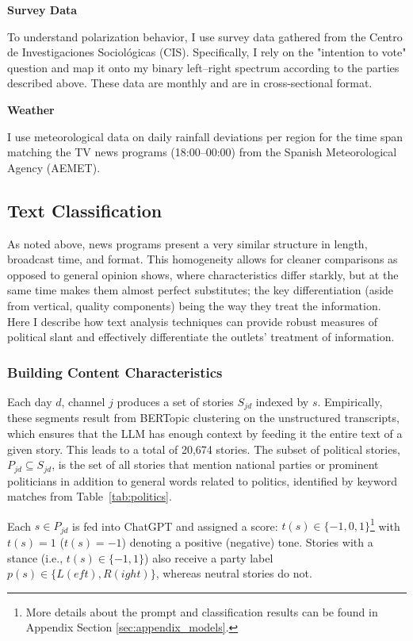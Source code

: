 \documentclass[12pt]{article}
\begin{document}
	
	\textbf{Survey Data}
	
	To understand polarization behavior, I use survey data gathered from the Centro de Investigaciones Sociológicas (CIS). Specifically, I rely on the "intention to vote" question and map it onto my binary left–right spectrum according to the parties described above. These data are monthly and are in cross-sectional format.
	
	\textbf{Weather}
	
	I use meteorological data on daily rainfall deviations per region for the time span matching the TV news programs (18:00–00:00) from the Spanish Meteorological Agency (AEMET).
	

	
	
	
	\subsection{Text Classification}
	
	As noted above,  news programs present a very similar structure in length, broadcast time, and format. This homogeneity allows for cleaner comparisons as opposed to general opinion shows, where characteristics differ starkly, but at the same time makes them almost perfect substitutes; the key differentiation (aside from vertical, quality components) being the way they treat the information. Here I describe how text analysis techniques can provide robust measures of political slant and effectively differentiate the outlets' treatment of  information. 
	

	
	\subsubsection*{Building Content Characteristics}
	
	Each day \(d\), channel \(j\) produces a set of stories \(S_{jd}\) indexed by \(s\). Empirically, these segments result from BERTopic clustering on the unstructured transcripts, which ensures that the LLM has enough context by feeding it the entire text of a given story. This leads to a total of 20,674 stories. The subset of political stories, \({P}_{jd}\subseteq S_{jd}\), is the set of all stories that mention national parties or prominent politicians in addition to general words related to politics, identified by keyword matches from Table~\ref{tab:politics}.
	
	Each \(s\in {P}_{jd}\) is fed into ChatGPT and  assigned a score: \({t}(s)\in\{-1,0,1\}\)\footnote{More details about the prompt and classification results can be found in Appendix Section \ref{sec:appendix_models}.} with ${t}(s)=1$ (${t}(s)=-1$) denoting a positive (negative) tone. Stories with a stance (i.e., \({t}(s)\in\{-1,1\}\)) also receive a party label \({p}(s)\in\{L(eft),R(ight)\}\), whereas neutral stories do not. 
	
\end{document}
